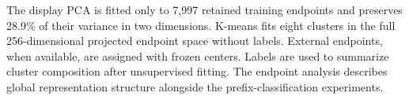 The display PCA is fitted only to 7,997 retained training endpoints and preserves 28.9\% of their variance in two dimensions. K-means fits eight clusters in the full 256-dimensional projected endpoint space without labels. External endpoints, when available, are assigned with frozen centers. Labels are used to summarize cluster composition after unsupervised fitting. The endpoint analysis describes global representation structure alongside the prefix-classification experiments.
